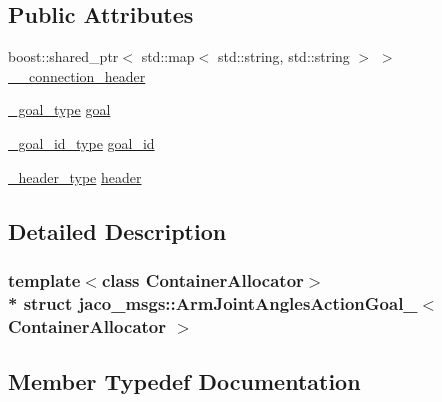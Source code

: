 \subsection*{Public Attributes}
\begin{DoxyCompactItemize}
\item 
boost\+::shared\+\_\+ptr$<$ std\+::map$<$ std\+::string, std\+::string $>$ $>$ \hyperlink{structjaco__msgs_1_1ArmJointAnglesActionGoal___a27a9d9e5613cf14b2f746836d83673d6}{\+\_\+\+\_\+connection\+\_\+header}
\item 
\hyperlink{structjaco__msgs_1_1ArmJointAnglesActionGoal___a9db4408e5eda0965ab7c3334e53a7a24}{\+\_\+goal\+\_\+type} \hyperlink{structjaco__msgs_1_1ArmJointAnglesActionGoal___a49d89800555751e2af0e706f63117a49}{goal}
\item 
\hyperlink{structjaco__msgs_1_1ArmJointAnglesActionGoal___aa65aa60f77df79b587a07808da34d260}{\+\_\+goal\+\_\+id\+\_\+type} \hyperlink{structjaco__msgs_1_1ArmJointAnglesActionGoal___a39cdbc82b664305b99e55ff1fe6bddd2}{goal\+\_\+id}
\item 
\hyperlink{structjaco__msgs_1_1ArmJointAnglesActionGoal___a43ebc2f136a276a4506784e53fd194ae}{\+\_\+header\+\_\+type} \hyperlink{structjaco__msgs_1_1ArmJointAnglesActionGoal___a22314506f0a5afc168c1520293c0face}{header}
\end{DoxyCompactItemize}


\subsection{Detailed Description}
\subsubsection*{template$<$class Container\+Allocator$>$\\*
struct jaco\+\_\+msgs\+::\+Arm\+Joint\+Angles\+Action\+Goal\+\_\+$<$ Container\+Allocator $>$}



\subsection{Member Typedef Documentation}
